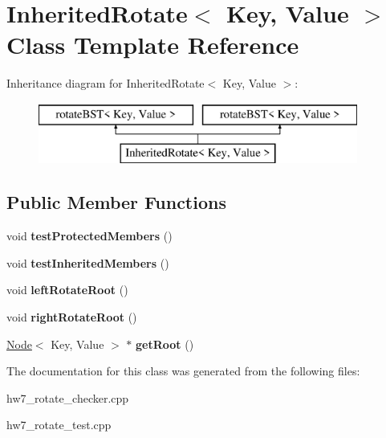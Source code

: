 \hypertarget{classInheritedRotate}{}\section{Inherited\+Rotate$<$ Key, Value $>$ Class Template Reference}
\label{classInheritedRotate}
Inheritance diagram for Inherited\+Rotate$<$ Key, Value $>$\+:\begin{figure}[H]
\begin{center}
\leavevmode
\includegraphics[height=2.000000cm]{classInheritedRotate}
\end{center}
\end{figure}
\subsection*{Public Member Functions}
\begin{DoxyCompactItemize}
\item 
\mbox{\label{classInheritedRotate_ac4c24eba0c0dcae88b9784ec504317c7}} 
void {\bfseries test\+Protected\+Members} ()
\item 
\mbox{\label{classInheritedRotate_a8d963ec64081e43e592da62cb1a0ac47}} 
void {\bfseries test\+Inherited\+Members} ()
\item 
\mbox{\label{classInheritedRotate_adec634aab9dba9426e58fc1b619c0eb7}} 
void {\bfseries left\+Rotate\+Root} ()
\item 
\mbox{\label{classInheritedRotate_a2ea0ef146a955c023df5f314de19a4c5}} 
void {\bfseries right\+Rotate\+Root} ()
\item 
\mbox{\label{classInheritedRotate_a8719303ced7dd31c3b8370a2f40f54d9}} 
\mbox{\hyperlink{classNode}{Node}}$<$ Key, Value $>$ $\ast$ {\bfseries get\+Root} ()
\end{DoxyCompactItemize}


The documentation for this class was generated from the following files\+:\begin{DoxyCompactItemize}
\item 
hw7\+\_\+rotate\+\_\+checker.\+cpp\item 
hw7\+\_\+rotate\+\_\+test.\+cpp\end{DoxyCompactItemize}
